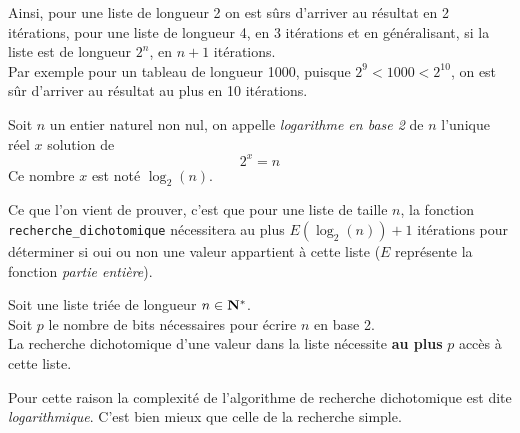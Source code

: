 Ainsi, pour une liste de longueur 2 on est sûrs d'arriver au résultat en 2 itérations, pour une liste de longueur 4, en 3 itérations et en généralisant, si la liste est de longueur $2^n$, en $n+1$ itérations.\\

Par exemple pour un tableau de longueur 1000, puisque $2^9<1000<2^{10}$, on est sûr d'arriver au résultat au plus en 10 itérations.\\

\begin{definition}[]
Soit $n$ un entier naturel non nul, on appelle \textit{logarithme en base 2} de $n$ l'unique réel $x$ solution de $$2^x=n$$
Ce nombre $x$ est noté $\log_2(n)$.

\end{definition}

Ce que l'on vient de prouver, c'est que pour une liste de taille $n$, la fonction\\
 \texttt{recherche_dichotomique} nécessitera au plus $E(\log_2(n))+1$ itérations pour déterminer si oui ou non une valeur appartient à cette liste ($E$ représente la fonction \textit{partie entière}).\\
 
\begin{propriete}
Soit une liste triée de longueur $n\in\mathbf{N}^*$.\\
Soit $p$ le nombre de bits nécessaires pour écrire $n$ en base 2.\\

La recherche dichotomique d'une valeur dans la liste nécessite \textbf{au plus} $p$ accès à cette liste.
\end{propriete}

Pour cette raison la complexité de l'algorithme de recherche dichotomique est dite \textit{logarithmique}. C'est bien mieux que celle de la recherche simple.